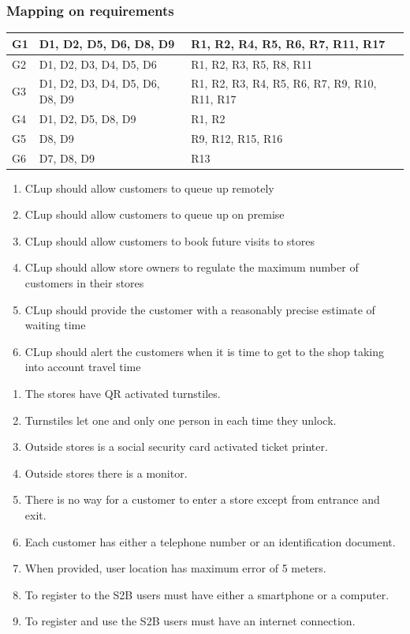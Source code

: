 \subsubsection{Mapping on requirements}
\begin{tabular}{ | m{3cm} | m{5cm} | m{9cm} | }
	\hline
	G1 & D1, D2, D5, D6, D8, D9 & R1, R2, R4, R5, R6, R7, R11, R17\\
	\hline
	G2 & D1, D2, D3, D4, D5, D6 & R1, R2, R3, R5, R8, R11\\
	\hline
	G3 & D1, D2, D3, D4, D5, D6, D8, D9 & R1, R2, R3, R4, R5, R6, R7, R9, R10, R11, R17\\
	\hline
	G4 & D1, D2, D5, D8, D9 & R1, R2 \\
	\hline
	G5 & D8, D9 & R9, R12, R15, R16\\
	\hline
	G6 & D7, D8, D9 & R13\\
	\hline

\end{tabular}
\begin{enumerate}[label=G\arabic*]
	\item CLup should allow customers to queue up remotely
	\item CLup should allow customers to queue up on premise
	\item CLup should allow customers to book future visits to stores
	\item CLup should allow store owners to regulate the maximum number of customers in their stores
	\item CLup should provide the customer with a reasonably precise estimate of waiting time
	\item CLup should alert the customers when it is time to get to the shop taking into account travel time
\end{enumerate}
\begin{enumerate}[label=D\arabic*]
	\item The stores have QR activated turnstiles.
	\item Turnstiles let one and only one person in each time they unlock.
	\item Outside stores is a social security card activated ticket printer.
	\item Outside stores there is a monitor.
	\item There is no way for a customer to enter a store except from entrance and exit.
	\item Each customer has either a telephone number or an identification document.
	\item When provided, user location has maximum error of 5 meters.
	\item To register to the S2B users must have either a smartphone or a computer.
	\item To register and use the S2B users must have an internet connection.
\end{enumerate}
